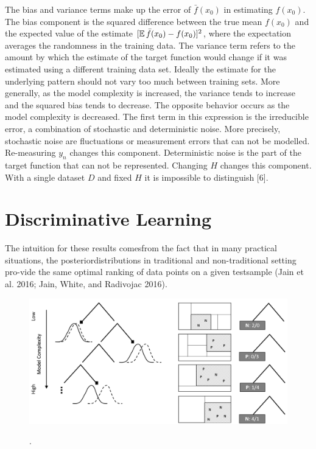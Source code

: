 The bias and variance terms make up the error of \(\bar{f}(x_0)\) in estimating \(f(x_0)\). The bias component is the squared difference between the true mean \(f(x_0)\) and the expected value of the estimate \([\operatorname{\mathbb{E}}\bar{f}(x_0) - f(x_0)]^2\), where the expectation averages the randomness in the training data. The variance term refers to the amount by which the estimate of the target function would change if it was estimated using a different training data set. Ideally the estimate for the underlying pattern should not vary too much between training sets. More generally, as the model complexity is increased, the variance tends to increase and the squared bias tends to decrease. The opposite behavior occurs as the model complexity is decreased. The first term in this expression is the irreducible error, a combination of stochastic and deterministic noise. More precisely, stochastic noise are fluctuations or measurement errors that can not be modelled. Re-measuring \(y_n\) changes this component. Deterministic noise is the part of the target function that can not be represented. Changing \(H\) changes this component. With a single dataset \(D\) and fixed \(H\) it is impossible to distinguish [6].  

\section{Discriminative Learning}

The intuition for these results comesfrom the fact that in many practical situations, the posteriordistributions in traditional and non-traditional setting pro-vide the same optimal ranking of data points on a given testsample (Jain et al. 2016; Jain, White, and Radivojac 2016).

\begin{figure}[ht]
	\begin{center}
		\includegraphics[scale=0.40,angle=0]{fig/tree3}
		\label{project}
		\caption{.}
	\end{center}
\end{figure}

